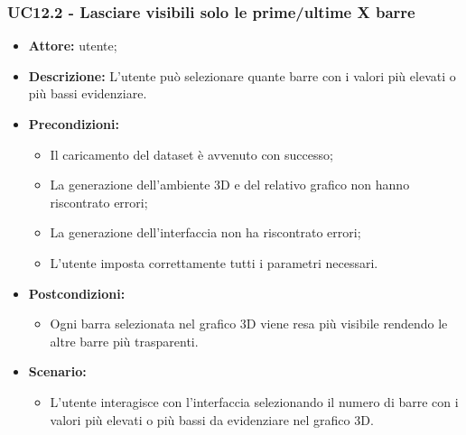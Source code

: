 \subsubsection{UC12.2 - Lasciare visibili solo le prime/ultime X barre}
\begin{itemize}    
    \item \textbf{Attore:} utente;
    \item \textbf{Descrizione:} L'utente può selezionare quante barre con i valori più elevati o più bassi evidenziare.
    \item \textbf{Precondizioni:}    
        \begin{itemize}
            \item Il caricamento del dataset è avvenuto con successo;
            \item La generazione dell'ambiente 3D e del relativo grafico non hanno riscontrato errori;
            \item La generazione dell'interfaccia non ha riscontrato errori;
            \item L'utente imposta correttamente tutti i parametri necessari.
        \end{itemize}    
    \item \textbf{Postcondizioni:}
        \begin{itemize}
            \item Ogni barra selezionata nel grafico 3D viene resa più visibile rendendo le altre barre più trasparenti.
        \end{itemize}    
    \item \textbf{Scenario:} 
        \begin{itemize}
            \item L'utente interagisce con l'interfaccia selezionando il numero di barre con i valori più elevati o più bassi da evidenziare nel grafico 3D.
        \end{itemize}
\end{itemize}
